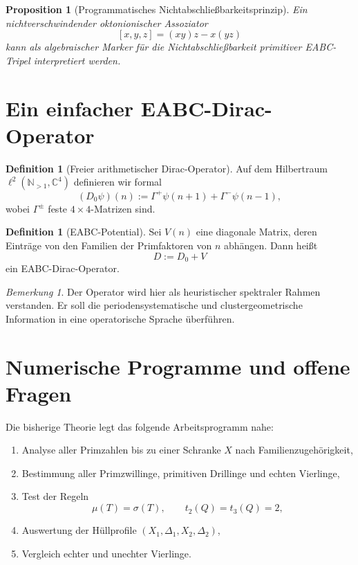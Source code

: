 \documentclass[12pt,a4paper]{article}
\newtheorem{proposition}[satz]{Proposition}
\theoremstyle{definition}
\newtheorem{definition}[satz]{Definition}
\theoremstyle{remark}
\newtheorem{bemerkung}[satz]{Bemerkung}
\newcommand{\N}{\mathbb{N}}
\newcommand{\C}{\mathbb{C}}
\newcommand{\signatur}{\sigma}
\begin{document}
	\begin{proposition}[Programmatisches Nichtabschließbarkeitsprinzip]
		Ein nichtverschwindender oktonionischer Assoziator
		\[
		[x,y,z]=(xy)z-x(yz)
		\]
		kann als algebraischer Marker für die Nichtabschließbarkeit primitiver EABC-Tripel interpretiert werden.
	\end{proposition}
	
	\section{Ein einfacher EABC-Dirac-Operator}
	
	\begin{definition}[Freier arithmetischer Dirac-Operator]
		Auf dem Hilbertraum \(\ell^2(\N_{>1},\C^4)\) definieren wir formal
		\[
		(D_0\psi)(n):=\Gamma^+\psi(n+1)+\Gamma^-\psi(n-1),
		\]
		wobei \(\Gamma^\pm\) feste \(4\times4\)-Matrizen sind.
	\end{definition}
	
	\begin{definition}[EABC-Potential]
		Sei \(V(n)\) eine diagonale Matrix, deren Einträge von den Familien der Primfaktoren von \(n\) abhängen. Dann heißt
		\[
		D:=D_0+V
		\]
		ein EABC-Dirac-Operator.
	\end{definition}
	
	\begin{bemerkung}
		Der Operator wird hier als heuristischer spektraler Rahmen verstanden. Er soll die periodensystematische und clustergeometrische Information in eine operatorische Sprache überführen.
	\end{bemerkung}
	
	
	
	\section{Numerische Programme und offene Fragen}
	
	Die bisherige Theorie legt das folgende Arbeitsprogramm nahe:
	\begin{enumerate}[label=\arabic*.]
		\item Analyse aller Primzahlen bis zu einer Schranke \(X\) nach Familienzugehörigkeit,
		\item Bestimmung aller Primzwillinge, primitiven Drillinge und echten Vierlinge,
		\item Test der Regeln
		\[
		\mu(T)=\signatur(T),\qquad t_2(Q)=t_3(Q)=2,
		\]
		\item Auswertung der Hüllprofile \((X_1,\Delta_1,X_2,\Delta_2)\),
		\item Vergleich echter und unechter Vierlinge.
	\end{enumerate}
	
\end{document}
